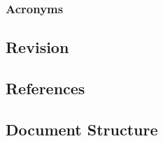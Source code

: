 \documentclass[12pt]{article}
\begin{document}
\subsubsection{Acronyms}


\subsection{Revision}

\subsection{References}


\subsection{Document Structure}
\clearpage
\end{document}
